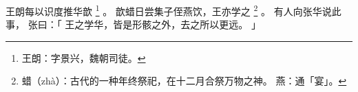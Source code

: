 \begin{paracol}{2}
\switchcolumn*[\section{}]

王朗每以识度推华歆%
\footnote{%
    王朗：字景兴，魏朝司徒。
}%
。
歆蜡日尝集子侄燕饮，王亦学之%
\footnote{%
    蜡（zhà）：古代的一种年终祭祀，在十二月合祭万物之神。
    燕：通「宴」。
}%
。
有人向张华说此事，
张曰：「
    王之学华，皆是形骸之外，去之所以更远。
」

\switchcolumn


\end{paracol}

